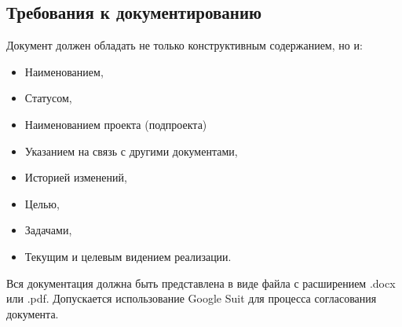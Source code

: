 \documentclass[16pt,a4paper]{article}
\begin{document}
\subsection{Требования к документированию}
Документ должен обладать не только конструктивным содержанием, но и:
\begin{itemize}
    \item Наименованием,
    \item Статусом,
    \item Наименованием проекта (подпроекта)
    \item Указанием на связь с другими документами,
    \item Историей изменений,
    \item Целью,
    \item Задачами,
    \item Текущим и целевым видением реализации.
\end{itemize}
Вся документация должна быть представлена в виде файла с расширением .docx или .pdf. Допускается использование Google Suit для процесса согласования документа.
\end{document}
